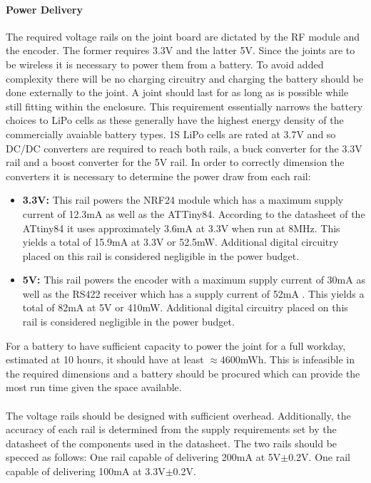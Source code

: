 \paragraph{Power Delivery} %
\label{par:power_delivery}
The required voltage rails on the joint board are dictated by the RF module and the encoder.
The former requires 3.3V and the latter 5V.
Since the joints are to be wireless it is necessary to power them from a battery.
To avoid added complexity there will be no charging circuitry and charging the battery should be done externally to the joint.
A joint should last for as long as is possible while still fitting within the enclosure.
This requirement essentially narrows the battery choices to LiPo cells as these generally have the highest energy density of the commercially avaiable battery types.
1S LiPo cells are rated at 3.7V and so DC/DC converters are required to reach both rails, a buck converter for the 3.3V rail and a boost converter for the 5V rail.
In order to correctly dimension the converters it is necessary to determine the power draw from each rail:
\begin{itemize}
 	\item \textbf{3.3V:} This rail powers the NRF24 module which has a maximum supply current of 12.3mA \cite{NFR24L01} as well as the ATTiny84.
 	According to the datasheet of the ATtiny84 it uses approximately 3.6mA at 3.3V when run at 8MHz.   
 	This yields a total of 15.9mA at 3.3V or 52.5mW.
 	Additional digital circuitry placed on this rail is considered negligible in the power budget.
 	\item \textbf{5V:} This rail powers the encoder with a maximum supply current of 30mA \cite{RLC2IC} as well as the RS422 receiver which has a supply current of 52mA \cite{rs422rec}.
 	This yields a total of 82mA at 5V or 410mW.
 	Additional digital circuitry placed on this rail is considered negligible in the power budget.
\end{itemize}
For a battery to have sufficient capacity to power the joint for a full workday, estimated at 10 hours, it should have at least $\approx4600$mWh.
This is infeasible in the required dimensions and a battery should be procured which can provide the most run time given the space available.
\\~\\
The voltage rails should be designed with sufficient overhead.
Additionally, the accuracy of each rail is determined from the supply requirements set by the datasheet of the components used in the datasheet.
The two rails should be specced as follows:
One rail capable of delivering 200mA at 5V$\pm$0.2V.
One rail capable of delivering 100mA at 3.3V$\pm$0.2V.

